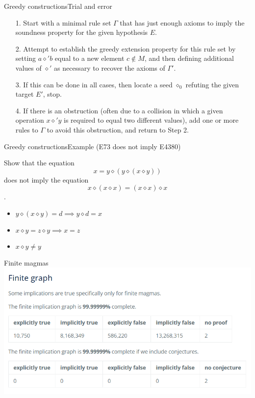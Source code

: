 \documentclass{beamer}
\newcommand{\op}{\diamond}
\begin{document}
\begin{frame}{Greedy constructions}{Trial and error}

\begin{itemize}
	\item[1.] Start with a minimal rule set $\Gamma$ that has just enough axioms to imply the soundness property for the given hypothesis $E$.
	\item[2.] Attempt to establish the greedy extension property for this rule set by setting $a \op' b$ equal to a new element $c \not \in M$, and then defining additional values of $\op'$ as necessary to recover the axioms of $\Gamma'$.
	\item[3.] If this can be done in all cases, then locate a seed $\op_0$ refuting the given target $E'$, stop.
	\item[4.] If there is an obstruction (often due to a collision in which a given operation $x \op' y$ is required to equal two different values), add one or more rules to $\Gamma$ to avoid this obstruction, and return to Step 2.
\end{itemize}

\end{frame}


\begin{frame}{Greedy constructions}{Example (E73 does not imply E4380)}

Show that the equation $$x = y \op (y \op (x \op y))$$ does not imply
the equation $$x \op (x \op x) = (x \op x) \op x$$
.
\begin{itemize}
	\pause\item $y \op (x \op y) = d \implies y \op d = x$
	\pause\item $x \op y = z \op y \implies x=z$
	\pause\item $x \op y \ne y$
\end{itemize}

\end{frame}


\begin{frame}{Finite magmas}
\includegraphics[width=\textwidth]{finite_status}
\end{frame}
\end{document}
